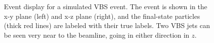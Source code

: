 \begin{figure}[htb]
    \centering
    \qquad
    \caption{
        Event display for a simulated VBS \WH event. 
        The event is shown in the x-y plane (left) and x-z plane (right), and the final-state particles (thick red lines) are labeled with their true labels. 
        Two VBS jets can be seen very near to the beamline, going in either direction in $z$. 
    }
    \label{fig:vbswh_fireworks}
\end{figure}

\clearpage

